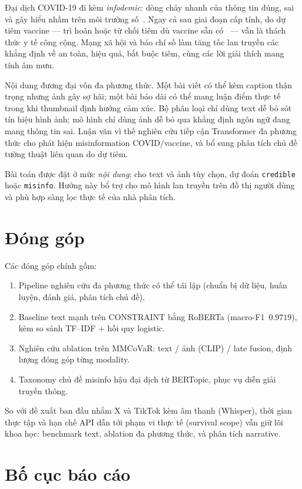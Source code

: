 \documentclass[12pt, a4paper]{report}
\begin{document}
Đại dịch COVID-19 đi kèm \emph{infodemic}: dòng chảy nhanh của thông tin đúng, sai và gây hiểu nhầm trên môi trường số~\cite{who2020infodemic}.
Ngay cả sau giai đoạn cấp tính, do dự tiêm vaccine --- trì hoãn hoặc từ chối tiêm dù vaccine sẵn có~\cite{macdonald2015hesitancy} --- vẫn là thách thức y tế công cộng.
Mạng xã hội và báo chí số làm tăng tốc lan truyền các khẳng định về an toàn, hiệu quả, bắt buộc tiêm, cùng các lời giải thích mang tính âm mưu.

Nội dung đương đại vốn đa phương thức.
Một bài viết có thể kèm caption thận trọng nhưng ảnh gây sợ hãi; một bài báo dài có thể mang luận điểm thực tế trong khi thumbnail định hướng cảm xúc.
Bộ phân loại chỉ dùng text dễ bỏ sót tín hiệu hình ảnh; mô hình chỉ dùng ảnh dễ bỏ qua khẳng định ngôn ngữ đang mang thông tin sai.
Luận văn vì thế nghiên cứu tiếp cận Transformer đa phương thức cho phát hiện misinformation COVID/vaccine, và bổ sung phân tích chủ đề tường thuật liên quan do dự tiêm.

Bài toán được đặt ở mức \emph{nội dung}: cho text và ảnh tùy chọn, dự đoán \texttt{credible} hoặc \texttt{misinfo}.
Hướng này bổ trợ cho mô hình lan truyền trên đồ thị người dùng và phù hợp sàng lọc thực tế của nhà phân tích.

\section{Đóng góp}
\label{sec:contribution}

Các đóng góp chính gồm:
\begin{enumerate}
  \item Pipeline nghiên cứu đa phương thức có thể tái lập (chuẩn bị dữ liệu, huấn luyện, đánh giá, phân tích chủ đề).
  \item Baseline text mạnh trên CONSTRAINT bằng RoBERTa (macro-F1~$0.9719$), kèm so sánh TF--IDF + hồi quy logistic.
  \item Nghiên cứu ablation trên MMCoVaR: text / ảnh (CLIP) / late fusion, định lượng đóng góp từng modality.
  \item Taxonomy chủ đề misinfo hậu đại dịch từ BERTopic, phục vụ diễn giải truyền thông.
\end{enumerate}

So với đề xuất ban đầu nhắm X và TikTok kèm âm thanh (Whisper), thời gian thực tập và hạn chế API dẫn tới phạm vi thực tế (survival scope) vẫn giữ lõi khoa học: benchmark text, ablation đa phương thức, và phân tích narrative.

\section{Bố cục báo cáo}
\label{sec:plan}
\end{document}
